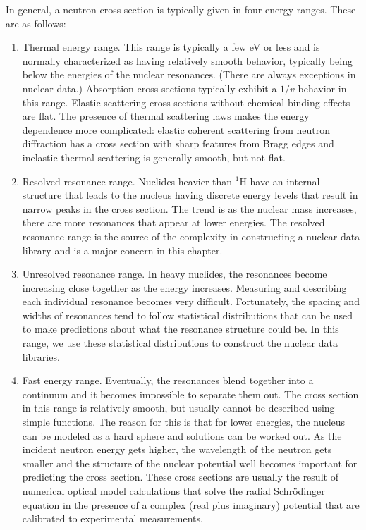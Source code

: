 In general, a neutron cross section is typically given in four energy ranges. These are as follows:
\begin{enumerate}
  \item Thermal energy range. This range is typically a few eV or less and is normally characterized as having relatively smooth behavior, typically being below the energies of the nuclear resonances. (There are always exceptions in nuclear data.) Absorption cross sections typically exhibit a $1/v$ behavior in this range. Elastic scattering cross sections without chemical binding effects are flat. The presence of thermal scattering laws makes the energy dependence more complicated: elastic coherent scattering from neutron diffraction has a cross section with sharp features from Bragg edges and inelastic thermal scattering is generally smooth, but not flat.
  \item Resolved resonance range. Nuclides heavier than $^1$H have an internal structure that leads to the nucleus having discrete energy levels that result in narrow peaks in the cross section. The trend is as the nuclear mass increases, there are more resonances that appear at lower energies. The resolved resonance range is the source of the complexity in constructing a nuclear data library and is a major concern in this chapter. 
  \item Unresolved resonance range. In heavy nuclides, the resonances become increasing close together as the energy increases. Measuring and describing each individual resonance becomes very difficult. Fortunately, the spacing and widths of resonances tend to follow statistical distributions that can be used to make predictions about what the resonance structure could be. In this range, we use these statistical distributions to construct the nuclear data libraries.
  \item Fast energy range. Eventually, the resonances blend together into a continuum and it becomes impossible to separate them out. The cross section in this range is relatively smooth, but usually cannot be described using simple functions. The reason for this is that for lower energies, the nucleus can be modeled as a hard sphere and solutions can be worked out. As the incident neutron energy gets higher, the wavelength of the neutron gets smaller and the structure of the nuclear potential well becomes important for predicting the cross section. These cross sections are usually the result of numerical optical model calculations that solve the radial Schr\"{o}dinger equation in the presence of a complex (real plus imaginary) potential that are calibrated to experimental measurements.
\end{enumerate}

